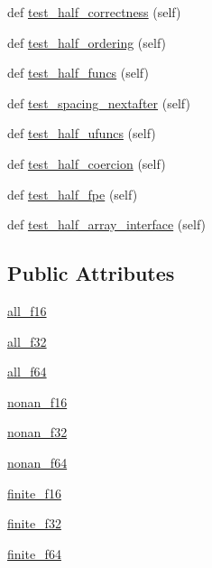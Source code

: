 \begin{DoxyCompactItemize}
\item 
def \hyperlink{classnumpy_1_1core_1_1tests_1_1test__half_1_1TestHalf_ab26bc561116dcc3b9dcb7acb9abfa4ec}{test\+\_\+half\+\_\+correctness} (self)
\item 
def \hyperlink{classnumpy_1_1core_1_1tests_1_1test__half_1_1TestHalf_a50128a0b4aa46a027f8e694e41b45e5f}{test\+\_\+half\+\_\+ordering} (self)
\item 
def \hyperlink{classnumpy_1_1core_1_1tests_1_1test__half_1_1TestHalf_a52acf04c1341a0008a5b2f867ea5369c}{test\+\_\+half\+\_\+funcs} (self)
\item 
def \hyperlink{classnumpy_1_1core_1_1tests_1_1test__half_1_1TestHalf_a3af52498301810a8b90e63495a5dbcb1}{test\+\_\+spacing\+\_\+nextafter} (self)
\item 
def \hyperlink{classnumpy_1_1core_1_1tests_1_1test__half_1_1TestHalf_a989d1bcd8873cb831b3d07ff0208584a}{test\+\_\+half\+\_\+ufuncs} (self)
\item 
def \hyperlink{classnumpy_1_1core_1_1tests_1_1test__half_1_1TestHalf_a30bc7d2d54a433df2b6046fb5b128c14}{test\+\_\+half\+\_\+coercion} (self)
\item 
def \hyperlink{classnumpy_1_1core_1_1tests_1_1test__half_1_1TestHalf_aa18ae3615bf14ebf01f45bbe8fc61827}{test\+\_\+half\+\_\+fpe} (self)
\item 
def \hyperlink{classnumpy_1_1core_1_1tests_1_1test__half_1_1TestHalf_a5009da0b4e0ca5ac847be7cccdd294bb}{test\+\_\+half\+\_\+array\+\_\+interface} (self)
\end{DoxyCompactItemize}
\subsection*{Public Attributes}
\begin{DoxyCompactItemize}
\item 
\hyperlink{classnumpy_1_1core_1_1tests_1_1test__half_1_1TestHalf_ae53e293db6cfb90e81bea074824c7382}{all\+\_\+f16}
\item 
\hyperlink{classnumpy_1_1core_1_1tests_1_1test__half_1_1TestHalf_a60f7225b9cc32198d62ba12762b3a256}{all\+\_\+f32}
\item 
\hyperlink{classnumpy_1_1core_1_1tests_1_1test__half_1_1TestHalf_a60010a904b13330e2e2ecd5a8a58cf37}{all\+\_\+f64}
\item 
\hyperlink{classnumpy_1_1core_1_1tests_1_1test__half_1_1TestHalf_ad0d8047016bc62e1a6748f2e5786506a}{nonan\+\_\+f16}
\item 
\hyperlink{classnumpy_1_1core_1_1tests_1_1test__half_1_1TestHalf_afc620a041e4751fed7b746d30f87eb00}{nonan\+\_\+f32}
\item 
\hyperlink{classnumpy_1_1core_1_1tests_1_1test__half_1_1TestHalf_ae7dbdff9b795088264abdf9539994096}{nonan\+\_\+f64}
\item 
\hyperlink{classnumpy_1_1core_1_1tests_1_1test__half_1_1TestHalf_a4e727409d8d0309ad5ae3fccdd2c0862}{finite\+\_\+f16}
\item 
\hyperlink{classnumpy_1_1core_1_1tests_1_1test__half_1_1TestHalf_aba52071085b5276035887aac9dde4c98}{finite\+\_\+f32}
\item 
\hyperlink{classnumpy_1_1core_1_1tests_1_1test__half_1_1TestHalf_a0911612ca3dcf02da4da93b3f07a4d45}{finite\+\_\+f64}
\end{DoxyCompactItemize}
